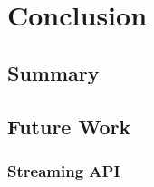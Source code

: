 
\chapter{Conclusion}\label{chapter:conclusion}

\section{Summary}
\section{Future Work}
\subsection{Streaming API}
